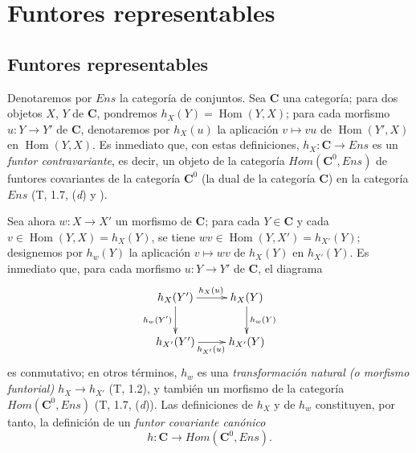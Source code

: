 \section{Funtores representables}
\label{section:0.8}
\label{section:0.8-fr}

\subsection{Funtores representables}
\label{subsection:0.8.1}
\label{subsection:0.8.1-fr}


\begin{env}[8.1.1]
\label{0.8.1.1}
\label{0.8.1.1-fr}
Denotaremos por $\boldsymbol{\mathit{Ens}}$ la categoría de conjuntos.
Sea $\boldsymbol{C}$ una categoría; para dos objetos $X$, $Y$ de $\boldsymbol{C}$, pondremos $h_X(Y)=\operatorname{Hom}(Y,X)$; para cada morfismo $u:Y\to Y'$ de $\boldsymbol{C}$, denotaremos por $h_X(u)$ la aplicación $v\mapsto vu$ de $\operatorname{Hom}(Y',X)$ en $\operatorname{Hom}(Y,X)$.
Es inmediato que, con estas definiciones, $h_X:\boldsymbol{C}\to\boldsymbol{\mathit{Ens}}$ es un \emph{funtor contravariante}, es decir, un objeto de la categoría $\boldsymbol{\mathit{Hom}}(\boldsymbol{C}^0,\boldsymbol{\mathit{Ens}})$ de funtores covariantes de la categoría $\boldsymbol{C}^0$ (la dual de la categoría $\boldsymbol{C}$) en la categoría $\boldsymbol{\mathit{Ens}}$ (T, 1.7, (\textit{d}) y \cite{III-29}).
\end{env}

\begin{env}[8.1.2]
\label{0.8.1.2}
\label{0.8.1.2-fr}
Sea ahora $w:X\to X'$ un morfismo de $\boldsymbol{C}$; para cada $Y\in\boldsymbol{C}$ y cada $v\in\operatorname{Hom}(Y,X)=h_X(Y)$,
se tiene $wv\in\operatorname{Hom}(Y,X')=h_{X'}(Y)$; designemos por $h_w(Y)$ la aplicación $v\mapsto wv$ de
$h_X(Y)$ en $h_{X'}(Y)$. Es inmediato que, para cada morfismo $u:Y\to Y'$ de $\boldsymbol{C}$, el
diagrama
\[
  \xymatrix{
    h_X(Y')\ar[r]^{h_X(u)}\ar[d]_{h_w(Y')} &
    h_X(Y)\ar[d]^{h_w(Y)}\\
    h_{X'}(Y')\ar[r]_{h_{X'}(u)} &
    h_{X'}(Y)
  }
\]
es conmutativo; en otros términos, $h_w$ es una \emph{transformación natural (o morfismo funtorial)
$h_X\to h_{X'}$} (T, 1.2), y también un morfismo de la categoría $\boldsymbol{\mathit{Hom}}(\boldsymbol{C}^0,\boldsymbol{\mathit{Ens}})$ (T, 1.7, (\textit{d})). Las
definiciones de $h_X$ y de $h_w$ constituyen, por tanto, la definición de un \emph{funtor covariante
canónico}
\[
  h:\boldsymbol{C}\to\boldsymbol{\mathit{Hom}}(\boldsymbol{C}^0,\boldsymbol{\mathit{Ens}}).
  \tag{8.1.2.1}
\]
\end{env}

